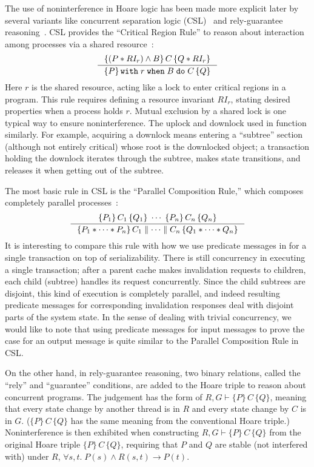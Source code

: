 The use of noninterference in Hoare logic has been made more explicit later by several variants like concurrent separation logic (CSL)~\cite{OHearn:2004} and rely-guarantee reasoning~\cite{Jones:1983}.
CSL provides the ``Critical Region Rule'' to reason about interaction among processes via a shared resource~\cite{Brookes:OHearn:2016}:
\begin{displaymath}
  \inference{\{ (P \ast RI_r) \wedge B \}\, C\, \{ Q \ast RI_r \}}
            {\{ P \}\, \texttt{with}\; r\; \texttt{when}\; B\; \texttt{do}\; C\, \{ Q \}}
\end{displaymath}
Here $r$ is the shared resource, acting like a lock to enter critical regions in a program.
This rule requires defining a resource invariant $RI_r$, stating desired properties when a process holds $r$.
Mutual exclusion by a shared lock is one typical way to ensure noninterference.
The uplock and downlock used in \hemiola{} function similarly.
For example, acquiring a downlock means entering a ``subtree'' section (although not entirely critical) whose root is the downlocked object; a transaction holding the downlock iterates through the subtree, makes state transitions, and releases it when getting out of the subtree.

The most basic rule in CSL is the ``Parallel Composition Rule,'' which composes completely parallel processes~\cite{Brookes:OHearn:2016}:
\begin{displaymath}
  \inference{\{P_1\}\,C_1\,\{Q_1\}\;\cdots\;\{P_n\}\,C_n\,\{Q_n\}}
            {\{P_1 \ast \cdots \ast P_n\}\,C_1 \parallel \cdots \parallel C_n\,\{Q_1 \ast \cdots \ast Q_n\}}
\end{displaymath}
It is interesting to compare this rule with how we use predicate messages in \hemiola{} for a single transaction on top of serializability.
There is still concurrency in executing a single transaction; \eg{} after a parent cache makes invalidation requests to children, each child (subtree) handles its request concurrently.
Since the child subtrees are disjoint, this kind of execution is completely parallel, and indeed resulting predicate messages for corresponding invalidation responses deal with disjoint parts of the system state.
In the sense of dealing with trivial concurrency, we would like to note that using predicate messages for input messages to prove the case for an output message is quite similar to the Parallel Composition Rule in CSL.

On the other hand, in rely-guarantee reasoning, two binary relations, called the ``rely'' and ``guarantee'' conditions, are added to the Hoare triple to reason about concurrent programs.
The judgement has the form of $R,G \vdash \{P\}\,C\,\{Q\}$, meaning that every state change by another thread is in $R$ and every state change by $C$ is in $G$.
($\{P\}\,C\,\{Q\}$ has the same meaning from the conventional Hoare triple.)
Noninterference is then exhibited when constructing $R,G \vdash \{P\}\,C\,\{Q\}$ from the original Hoare triple $\{P\}\,C\,\{Q\}$, requiring that $P$ and $Q$ are stable (not interfered with) under $R$, \ie{} $\forall s, t.\; P(s) \wedge R(s, t) \to P(t)$.

